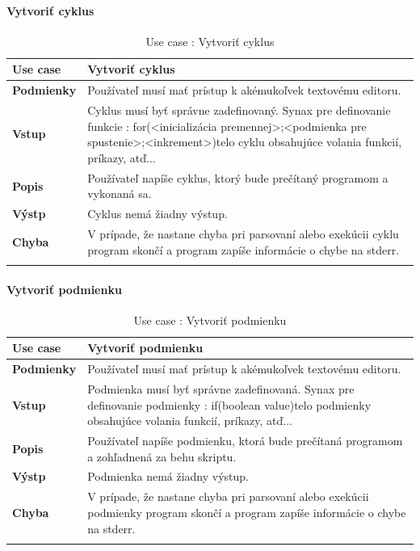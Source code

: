 \paragraph{Vytvoriť cyklus}
\begin{center}
	\begin{longtable}{|p{2.5cm}|p{14cm}|}
		
			\hline
			\textbf{Use case} & Vytvoriť cyklus \\ 
			\hline
			\textbf{Podmienky} & Používateľ musí mať prístup k akémukoľvek textovému editoru.  \\ 
			\hline
			\textbf{Vstup} & Cyklus musí byť správne zadefinovaný. 
			Synax pre definovanie funkcie : 
			for(<inicializácia premennej>;<podmienka pre spustenie>;<inkrement>){telo cyklu obsahujúce volania funkcií, príkazy, atď..}. \\
			\hline

			\textbf{Popis} & Používateľ napíše cyklus, ktorý bude prečítaný programom a vykonaná sa.\\ 
			\hline
			\textbf{Výstp} & Cyklus nemá žiadny výstup.\\
			\hline
			\textbf{Chyba} & V prípade, že nastane chyba pri parsovaní alebo exekúcii cyklu program skončí a program zapíše informácie o chybe na stderr.\\
			\hline
		\caption{Use case : Vytvoriť cyklus}
		\label{table:1}
		
	\end{longtable}
\end{center}
\paragraph{Vytvoriť podmienku}
\begin{center}
	\begin{longtable}{|p{2.5cm}|p{14cm}|}
		
			\hline
			\textbf{Use case} & Vytvoriť podmienku \\ 
			\hline
			\textbf{Podmienky} & Používateľ musí mať prístup k akémukoľvek textovému editoru.  \\ 
			\hline
			\textbf{Vstup} & Podmienka musí byť správne zadefinovaná. 
			Synax pre definovanie podmienky : 
			if(boolean value){telo podmienky obsahujúce volania funkcií, príkazy, atď..}. \\
			\hline
			\textbf{Popis} & Používateľ napíše podmienku, ktorá bude prečítaná programom a zohľadnená za behu skriptu.\\ 
			\hline
			\textbf{Výstp} & Podmienka nemá žiadny výstup.\\
			\hline
			\textbf{Chyba} & V prípade, že nastane chyba pri parsovaní alebo exekúcii podmienky program skončí a program zapíše informácie o chybe na stderr.\\
			\hline
		\caption{Use case : Vytvoriť podmienku}
		\label{table:1}
		
	\end{longtable}
\end{center}
